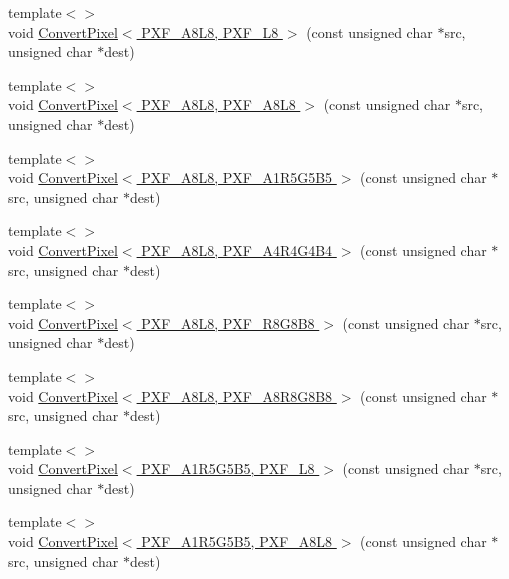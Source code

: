 \begin{DoxyCompactItemize}
\item 
{\footnotesize template$<$$>$ }\\void \hyperlink{_convert_pixel_8inl_ac48d1e6ac672e1e2e8d5746db9b30d9d}{Convert\+Pixel$<$ P\+X\+F\+\_\+\+A8\+L8, P\+X\+F\+\_\+\+L8 $>$} (const unsigned char $\ast$src, unsigned char $\ast$dest)
\item 
{\footnotesize template$<$$>$ }\\void \hyperlink{_convert_pixel_8inl_a2354d834255dcccf87944c2c39b05ba5}{Convert\+Pixel$<$ P\+X\+F\+\_\+\+A8\+L8, P\+X\+F\+\_\+\+A8\+L8 $>$} (const unsigned char $\ast$src, unsigned char $\ast$dest)
\item 
{\footnotesize template$<$$>$ }\\void \hyperlink{_convert_pixel_8inl_a286a89ffa2651826bc96df677e00d594}{Convert\+Pixel$<$ P\+X\+F\+\_\+\+A8\+L8, P\+X\+F\+\_\+\+A1\+R5\+G5\+B5 $>$} (const unsigned char $\ast$src, unsigned char $\ast$dest)
\item 
{\footnotesize template$<$$>$ }\\void \hyperlink{_convert_pixel_8inl_a797a1090a568689a0bfc8b93addd4791}{Convert\+Pixel$<$ P\+X\+F\+\_\+\+A8\+L8, P\+X\+F\+\_\+\+A4\+R4\+G4\+B4 $>$} (const unsigned char $\ast$src, unsigned char $\ast$dest)
\item 
{\footnotesize template$<$$>$ }\\void \hyperlink{_convert_pixel_8inl_ad9a9251a5d6eb1ab66d536f68e14fe69}{Convert\+Pixel$<$ P\+X\+F\+\_\+\+A8\+L8, P\+X\+F\+\_\+\+R8\+G8\+B8 $>$} (const unsigned char $\ast$src, unsigned char $\ast$dest)
\item 
{\footnotesize template$<$$>$ }\\void \hyperlink{_convert_pixel_8inl_aae02b1bc2ec34922e695eb2b0ec97459}{Convert\+Pixel$<$ P\+X\+F\+\_\+\+A8\+L8, P\+X\+F\+\_\+\+A8\+R8\+G8\+B8 $>$} (const unsigned char $\ast$src, unsigned char $\ast$dest)
\item 
{\footnotesize template$<$$>$ }\\void \hyperlink{_convert_pixel_8inl_a59aea03431463c8350071e16af1449fa}{Convert\+Pixel$<$ P\+X\+F\+\_\+\+A1\+R5\+G5\+B5, P\+X\+F\+\_\+\+L8 $>$} (const unsigned char $\ast$src, unsigned char $\ast$dest)
\item 
{\footnotesize template$<$$>$ }\\void \hyperlink{_convert_pixel_8inl_ad258926ce9d6e2689f2899b2b2dc66db}{Convert\+Pixel$<$ P\+X\+F\+\_\+\+A1\+R5\+G5\+B5, P\+X\+F\+\_\+\+A8\+L8 $>$} (const unsigned char $\ast$src, unsigned char $\ast$dest)
\item 

\end{DoxyCompactItemize}

